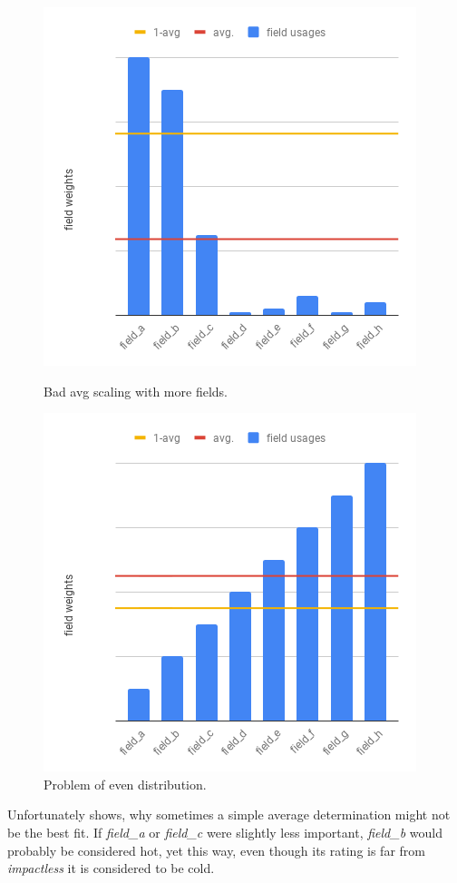 \begin{figure}[ht]
\begin{minipage}[b]{0.5\linewidth}
		\centering\includegraphics[width=\textwidth,height=0.7\textwidth]{PICs/avg_as_delimiter_3}
		\caption{Bad avg scaling with more fields.}
		\label{avg_delimiter_bad_2}
	\end{minipage}
	\hspace{0.5cm}
	\begin{minipage}[b]{0.5\linewidth}
		\centering\includegraphics[width=\textwidth,height=0.7\textwidth]{PICs/avg_as_delimiter_4}
		\caption{Problem of even distribution.}
		\label{avg_delimiter_bad_3}
	\end{minipage}
\end{figure}
Unfortunately  shows, why sometimes a simple average determination might not be the best fit. If \textit{field\_a} or \textit{field\_c} were slightly less important, \textit{field\_b} would probably be considered hot, yet this way, even though its rating is far from \textit{impactless} it is considered to be cold.\\
